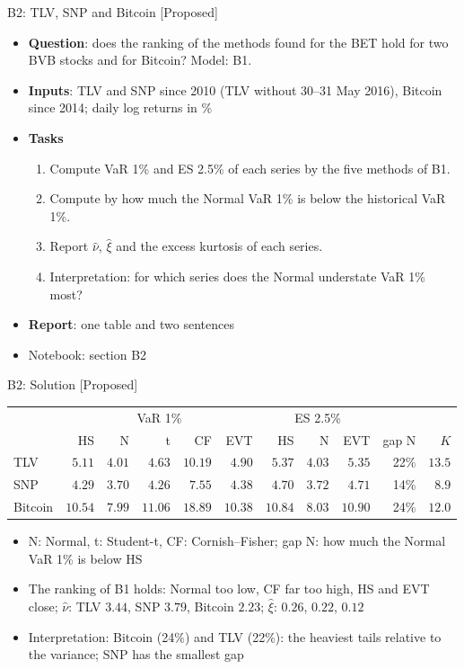 \begin{frame}{B2: TLV, SNP and Bitcoin [Proposed]}
\itemsize{\footnotesize}
\begin{itemize}
\item \textbf{Question}: does the ranking of the methods found for the BET hold for two BVB stocks and for Bitcoin? Model: B1.
\item \textbf{Inputs}: TLV and SNP since 2010 (TLV without 30--31 May 2016), Bitcoin since 2014; daily log returns in \%
\item \textbf{Tasks}
\begin{enumerate}
    \item Compute VaR 1\% and ES 2.5\% of each series by the five methods of B1.
    \item Compute by how much the Normal VaR 1\% is below the historical VaR 1\%.
    \item Report $\hat\nu$, $\hat\xi$ and the excess kurtosis of each series.
    \item Interpretation: for which series does the Normal understate VaR 1\% most?
\end{enumerate}
\item \textbf{Report}: one table and two sentences
\item Notebook: section B2
\end{itemize}
\end{frame}

\ifsolutions
\begin{frame}{B2: Solution [Proposed]}
\itemsize{\footnotesize}
\begin{center}
\scriptsize
\begin{tabular}{l|rrrrr|rrr|rr}
\toprule
& \multicolumn{5}{c|}{VaR 1\%} & \multicolumn{3}{c|}{ES 2.5\%} & & \\ & HS & N & t & CF & EVT & HS & N & EVT & gap N & $K$ \\
\midrule
TLV & $5.11$ & $4.01$ & $4.63$ & $10.19$ & $4.90$ & $5.37$ & $4.03$ & $5.35$ & 22\% & ${13.5}$ \\
SNP & $4.29$ & $3.70$ & $4.26$ & $7.55$ & $4.38$ & $4.70$ & $3.72$ & $4.71$ & 14\% & ${8.9}$ \\
Bitcoin & $10.54$ & $7.99$ & $11.06$ & $18.89$ & $10.38$ & $10.84$ & $8.03$ & $10.90$ & 24\% & ${12.0}$ \\
\bottomrule
\end{tabular}
\end{center}
\begin{itemize}
    \item N: Normal, t: Student-t, CF: Cornish--Fisher; gap N: how much the Normal VaR 1\% is below HS
    \item The ranking of B1 holds: Normal too low, CF far too high, HS and EVT close; $\hat\nu$: TLV $3.44$, SNP $3.79$, Bitcoin $2.23$; $\hat\xi$: $0.26$, $0.22$, $0.12$
    \item Interpretation: Bitcoin (24\%) and TLV (22\%): the heaviest tails relative to the variance; SNP has the smallest gap
\end{itemize}
\end{frame}
\fi

